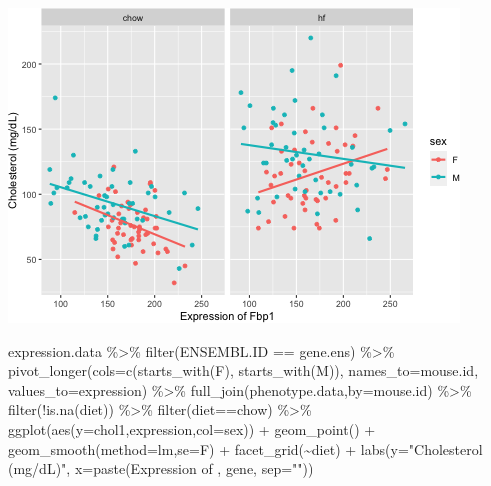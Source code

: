 \documentclass[
]{article}
\newenvironment{Shaded}{\begin{snugshade}}{\end{snugshade}}
\newcommand{\AttributeTok}[1]{\textcolor[rgb]{0.77,0.63,0.00}{#1}}
\newcommand{\FunctionTok}[1]{\textcolor[rgb]{0.00,0.00,0.00}{#1}}
\newcommand{\NormalTok}[1]{#1}
\newcommand{\SpecialCharTok}[1]{\textcolor[rgb]{0.00,0.00,0.00}{#1}}
\newcommand{\StringTok}[1]{\textcolor[rgb]{0.31,0.60,0.02}{#1}}
\begin{document}
\includegraphics{figures/Fbp1-associations-1.png}

\begin{Shaded}
\begin{Highlighting}[]
\NormalTok{expression.data }\SpecialCharTok{\%\textgreater{}\%}
  \FunctionTok{filter}\NormalTok{(ENSEMBL.ID }\SpecialCharTok{==}\NormalTok{ gene.ens) }\SpecialCharTok{\%\textgreater{}\%}
  \FunctionTok{pivot\_longer}\NormalTok{(}\AttributeTok{cols=}\FunctionTok{c}\NormalTok{(}\FunctionTok{starts\_with}\NormalTok{(}\StringTok{\textquotesingle{}F\textquotesingle{}}\NormalTok{),}
                      \FunctionTok{starts\_with}\NormalTok{(}\StringTok{\textquotesingle{}M\textquotesingle{}}\NormalTok{)),}
               \AttributeTok{names\_to=}\StringTok{\textquotesingle{}mouse.id\textquotesingle{}}\NormalTok{,}
               \AttributeTok{values\_to=}\StringTok{\textquotesingle{}expression\textquotesingle{}}\NormalTok{) }\SpecialCharTok{\%\textgreater{}\%}
  \FunctionTok{full\_join}\NormalTok{(phenotype.data,}\AttributeTok{by=}\StringTok{\textquotesingle{}mouse.id\textquotesingle{}}\NormalTok{) }\SpecialCharTok{\%\textgreater{}\%}
  \FunctionTok{filter}\NormalTok{(}\SpecialCharTok{!}\FunctionTok{is.na}\NormalTok{(diet)) }\SpecialCharTok{\%\textgreater{}\%}
  \FunctionTok{filter}\NormalTok{(diet}\SpecialCharTok{==}\StringTok{\textquotesingle{}chow\textquotesingle{}}\NormalTok{) }\SpecialCharTok{\%\textgreater{}\%}
  \FunctionTok{ggplot}\NormalTok{(}\FunctionTok{aes}\NormalTok{(}\AttributeTok{y=}\NormalTok{chol1,expression,}\AttributeTok{col=}\NormalTok{sex)) }\SpecialCharTok{+}
  \FunctionTok{geom\_point}\NormalTok{() }\SpecialCharTok{+}
  \FunctionTok{geom\_smooth}\NormalTok{(}\AttributeTok{method=}\StringTok{\textquotesingle{}lm\textquotesingle{}}\NormalTok{,}\AttributeTok{se=}\NormalTok{F) }\SpecialCharTok{+}
  \FunctionTok{facet\_grid}\NormalTok{(}\SpecialCharTok{\textasciitilde{}}\NormalTok{diet) }\SpecialCharTok{+}
  \FunctionTok{labs}\NormalTok{(}\AttributeTok{y=}\StringTok{"Cholesterol (mg/dL)"}\NormalTok{,}
       \AttributeTok{x=}\FunctionTok{paste}\NormalTok{(}\StringTok{\textquotesingle{}Expression of \textquotesingle{}}\NormalTok{, gene, }\AttributeTok{sep=}\StringTok{""}\NormalTok{))}
\end{Highlighting}
\end{Shaded}
\end{document}
